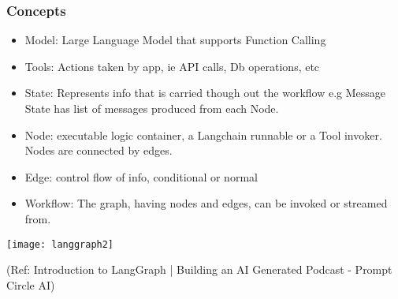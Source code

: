 		
				



		
				



\begin{frame}\frametitle{Concepts}

\begin{itemize}
\item Model: Large Language Model that supports Function Calling
\item Tools: Actions taken by app, ie API calls, Db operations, etc
\item State: Represents info that is carried though out the workflow e.g Message State has list of messages produced from each Node.
\item Node: executable logic container, a Langchain runnable or a Tool invoker. Nodes are connected by edges.
\item Edge: control flow of info, conditional or normal
\item Workflow: The graph, having nodes and edges, can be invoked or streamed from.
\end{itemize}

\begin{center}
\texttt{[image: langgraph2]}
\end{center}	  

{\tiny (Ref: Introduction to LangGraph | Building an AI Generated Podcast - Prompt Circle AI)}
\end{frame}

